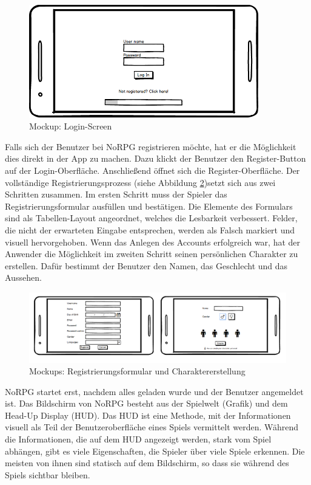 			\begin{figure}[htbp]
				\centering 
				\label{mockupLogin}
				\includegraphics[width=10cm]{pics/Login.png}
				\caption{Mockup: Login-Screen}
			\end{figure}
			
			Falls sich der Benutzer bei NoRPG registrieren möchte, hat er die Möglichkeit dies direkt in der App zu machen. Dazu klickt der Benutzer den Register-Button auf der Login-Oberfläche. Anschließend öffnet sich die Register-Oberfläche. Der vollständige Registrierungsprozess (siehe Abbildung \ref{mockupsRegistrierung})setzt sich aus zwei Schritten zusammen. Im ersten Schritt muss der Spieler das Registrierungsformular ausfüllen und bestätigen. Die Elemente des Formulars sind als Tabellen-Layout angeordnet, welches die Lesbarkeit verbessert. Felder, die nicht der erwarteten Eingabe entsprechen, werden als Falsch markiert und visuell hervorgehoben. Wenn das Anlegen des Accounts erfolgreich war, hat der Anwender die Möglichkeit im zweiten Schritt seinen persönlichen Charakter zu erstellen. Dafür bestimmt der Benutzer den Namen, das Geschlecht und das Aussehen.
			
			\begin{figure}[htbp]
				\centering 
				\label{mockupsRegistrierung}
				\includegraphics[width=\textwidth]{pics/Registerprozess.png}
				\caption{Mockups: Registrierungsformular und Charaktererstellung}
			\end{figure}
		
			NoRPG startet erst, nachdem alles geladen wurde und der Benutzer angemeldet ist. Das Bildschirm von NoRPG besteht aus der Spielwelt (Grafik) und dem Head-Up Display (HUD). Das HUD ist eine Methode, mit der Informationen visuell als Teil der Benutzeroberfläche eines Spiels vermittelt werden. Während die Informationen, die auf dem HUD angezeigt werden, stark vom Spiel abhängen, gibt es viele Eigenschaften, die Spieler über viele Spiele erkennen. Die meisten von ihnen sind statisch auf dem Bildschirm, so dass sie während des Spiels sichtbar bleiben.  
			
